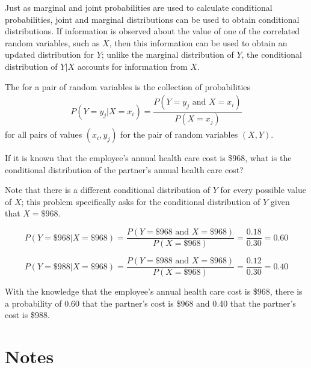 Just as marginal and joint probabilities are used to calculate conditional probabilities, joint and marginal distributions can be used to obtain conditional distributions. If information is observed about the value of one of the correlated random variables, such as $X$, then this information can be used to obtain an updated distribution for $Y$; unlike the marginal distribution of $Y$, the conditional distribution of $Y|X$ accounts for information from $X$.

\begin{termBox}{
		The  for a pair of random variables is the collection of probabilities
		\begin{align*}
		P(Y = y_j| X = x_i) = \dfrac{P(Y = y_j \text{ and } X = x_i)}{P(X = x_j)}
		\end{align*}
		for all pairs of values $(x_i,y_j)$ for the pair of random variables $(X,Y)$.}
\end{termBox}

\begin{example}{If it is known that the employee's annual health care cost is \$968, what is the conditional distribution of the partner's annual health care cost?}
	
Note that there is a different conditional distribution of $Y$ for every possible value of $X$; this problem specifically asks for the conditional distribution of $Y$ given that $X = \$968$.
	
	\[P(Y = \$968 | X = \$968) = \dfrac{P(Y = \$968 \textrm{ and } X = \$968)}{P(X = \$968)} = \dfrac{0.18}{0.30} = 0.60\]
	
	\[P(Y = \$988 | X = \$968) = \dfrac{P(Y = \$988 \textrm{ and } X = \$968)}{P(X = \$968)} = \dfrac{0.12}{0.30} = 0.40\]
	
With the knowledge that the employee's annual health care cost is \$968, there is a probability of 0.60 that the partner's cost is \$968 and 0.40 that the partner's cost is \$988.	
	
\end{example}


\newpage

\section{Notes}

